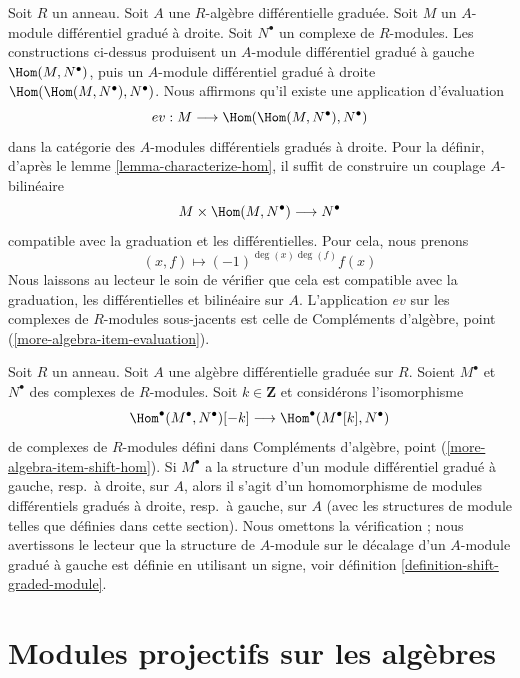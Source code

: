 \begin{remark}
\label{remark-evaluation-map-right}
Soit $R$ un anneau. Soit $A$ une $R$-algèbre différentielle graduée.
Soit $M$ un $A$-module différentiel gradué à droite. Soit
$N^\bullet$ un complexe de $R$-modules. Les constructions ci-dessus produisent
un $A$-module différentiel gradué à gauche $\Hom(M, N^\bullet)$, puis un
$A$-module différentiel gradué à droite $\Hom(\Hom(M,
N^\bullet), N^\bullet)$. Nous affirmons qu'il existe une application d'évaluation
$$
ev : M \longrightarrow \Hom(\Hom(M, N^\bullet), N^\bullet)
$$
dans la catégorie des $A$-modules différentiels gradués à droite. Pour la définir,
d'après le lemme \ref{lemma-characterize-hom}, il suffit de construire un
couplage $A$-bilinéaire
$$
M \times \Hom(M, N^\bullet) \longrightarrow N^\bullet
$$
compatible avec la graduation et les différentielles. Pour cela, nous prenons
$$
(x, f) \longmapsto (-1)^{\deg(x)\deg(f)}f(x)
$$
Nous laissons au lecteur le soin de vérifier que cela est compatible avec la
graduation, les différentielles et bilinéaire sur $A$. L'application $ev$ sur les complexes de
$R$-modules sous-jacents est celle de Compléments d'algèbre, point (\ref{more-algebra-item-evaluation}).
\end{remark}

\begin{remark}
\label{remark-shift-dual}
Soit $R$ un anneau. Soit $A$ une algèbre différentielle graduée sur
$R$. Soient $M^\bullet$ et $N^\bullet$ des complexes de
$R$-modules. Soit $k \in \mathbf{Z}$ et considérons l'isomorphisme
$$
\Hom^\bullet(M^\bullet, N^\bullet)[-k]
\longrightarrow
\Hom^\bullet(M^\bullet[k], N^\bullet)
$$
de complexes de $R$-modules défini dans
Compléments d'algèbre, point (\ref{more-algebra-item-shift-hom}). Si
$M^\bullet$ a la structure d'un module différentiel gradué à gauche, resp.\ à droite,
sur $A$, alors il s'agit d'un homomorphisme de modules
différentiels gradués à droite, resp.\ à gauche, sur $A$ (avec les
structures de module telles que définies dans cette section).
Nous omettons la vérification ; nous avertissons le lecteur que la
structure de $A$-module sur le décalage d'un $A$-module gradué à gauche est
définie en utilisant un signe,
voir définition \ref{definition-shift-graded-module}.
\end{remark}






\section{Modules projectifs sur les algèbres}
\label{section-projectives-over-algebras}

